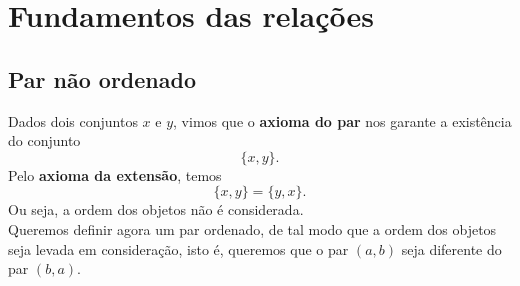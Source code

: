 \section{Fundamentos das relações}
   \subsection{Par não ordenado}
      Dados dois conjuntos $x$ e $y$, vimos que o \textbf{axioma do par} nos garante a existência do conjunto
      $$\{x, y\}.$$
      Pelo \textbf{axioma da extensão}, temos
      $$\{x,y\} = \{y,x\}.$$
      Ou seja, a ordem dos objetos não é considerada.\\
      Queremos definir agora um par ordenado, de tal modo que a ordem dos objetos seja levada em consideração, isto é, queremos que o par $(a ,b)$ seja diferente do par $(b ,a)$.
